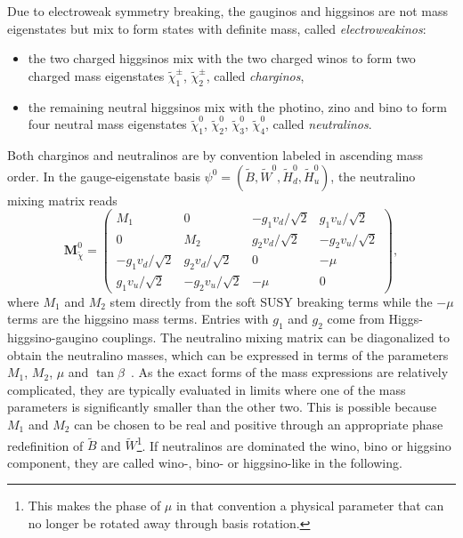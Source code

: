 Due to electroweak symmetry breaking, the gauginos and higgsinos are not mass eigenstates but mix to form states with definite mass, called \textit{electroweakinos}: 
\begin{itemize}
	\item the two charged higgsinos mix with the two charged winos to form two charged mass eigenstates $\tilde{\chi}_1^\pm$, $\tilde{\chi}_2^\pm$, called \textit{charginos},
	\item the remaining neutral higgsinos mix with the photino, zino and bino to form four neutral mass eigenstates $\tilde{\chi}_1^0$, $\tilde{\chi}_2^0$, $\tilde{\chi}_3^0$, $\tilde{\chi}_4^0$, called \textit{neutralinos}.
\end{itemize}
Both charginos and neutralinos are by convention labeled in ascending mass order. In the gauge-eigenstate basis $\psi^0 = (\tilde{B},\tilde{W}^0,\tilde{H}^0_d,\tilde{H}^0_u)$, the neutralino mixing matrix reads~\cite{Martin:1997ns}
\begin{equation}
	\boldsymbol{M}_{\tilde{\chi}}^0 = 	\begin{pmatrix}
		M_1 & 0 & -g_1v_d/\sqrt{2} & g_1 v_u/\sqrt{2} \\
		0 & M_2 & g_2 v_d/\sqrt{2} & - g_2 v_u/\sqrt{2} \\
		- g_1 v_d/\sqrt{2} & g_2 v_d/\sqrt{2} & 0 & -\mu \\
		g_1 v_u/\sqrt{2} & -g_2 v_u/\sqrt{2} & -\mu & 0
	\end{pmatrix},
	\label{eq:neutralino_mixing}
\end{equation}
where $M_1$ and $M_2$ stem directly from the soft SUSY breaking terms while the $-\mu$ terms are the higgsino mass terms. Entries with $g_1$ and $g_2$ come from Higgs-higgsino-gaugino couplings. The neutralino mixing matrix can be diagonalized to obtain the neutralino masses, which can be expressed in terms of the parameters $M_1$, $M_2$, $\mu$ and $\tan{\beta}$~\cite{Martin:1997ns}. As the exact forms of the mass expressions are relatively complicated, they are typically evaluated in limits where one of the mass parameters is significantly smaller than the other two. This is possible because $M_1$ and $M_2$ can be chosen to be real and positive through an appropriate phase redefinition of $\tilde{B}$ and $\tilde{W}$\footnote{This makes the phase of $\mu$ in that convention a physical parameter that can no longer be rotated away through basis rotation.}. If neutralinos are dominated the wino, bino or higgsino component, they are called wino-, bino- or higgsino-like in the following.

